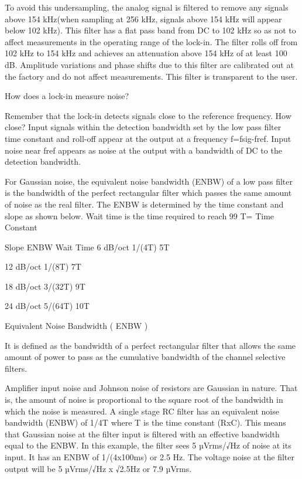 \documentclass[final,5p,12pt,twocolumn]{elsaarticle}
\begin{document}
To avoid this undersampling, the analog signal is filtered to remove any signals above 154 kHz(when sampling at 256 kHz, signals above 154 kHz will appear below 102 kHz). This filter has a flat pass band from DC to 102 kHz so as not to affect measurements in the operating range of the lock-in. The filter rolls off from 102 kHz to 154 kHz and achieves an attenuation above 154 kHz of at least 100 dB. Amplitude variations and phase shifts due to this filter are calibrated out at the factory and do not affect measurements. This filter is transparent to the user.

How does a lock-in measure noise?

Remember that the lock-in detects signals close to the reference frequency. How close? Input signals within the detection bandwidth set by the low pass filter time constant and roll-off appear at the output at a frequency f=fsig-fref. Input noise near fref appears as noise at the output with a bandwidth of DC to the detection bandwidth.

For Gaussian noise, the equivalent noise bandwidth (ENBW) of a low pass filter is the bandwidth of the perfect rectangular filter which passes the same amount of noise as the real filter. The ENBW is determined by the time constant and slope as shown below. Wait time is the time required to reach 99%
T= Time Constant

 Slope                 ENBW                Wait Time
6 dB/oct              1/(4T)                       5T

12 dB/oct            1/(8T)                       7T

18 dB/oct            3/(32T)                     9T

24 dB/oct            5/(64T)                     10T

Equivalent Noise Bandwidth ( ENBW )

It is defined as the bandwidth of a perfect rectangular filter that allows the same amount of power to pass as the cumulative bandwidth of the channel selective filters.

Amplifier input noise and Johnson noise of resistors are Gaussian in nature. That is, the amount of noise is proportional to the square root of the bandwidth in which the noise is measured. A single stage RC filter has an equivalent noise bandwidth (ENBW) of 1/4T where T is the time constant (RxC). This means that Gaussian noise at the filter input is filtered with an effective bandwidth equal to the ENBW. In this example, the filter sees 5 µVrms/√Hz of noise at its input. It has an ENBW of 1/(4x100ms) or 2.5 Hz. The voltage noise at the filter output will be 5 µVrms/√Hz x √2.5Hz or 7.9 µVrms.
\end{document}
